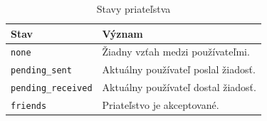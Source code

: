   \begin{table}[h]
      \centering                                                                                                                                                                                                                   
      \caption{Stavy priateľstva}
      \label{tab:friendship-states}
      \begin{tabular}{ll}
          \toprule                                                                                                                                                                                                                 
          \textbf{Stav} & \textbf{Význam} \\                                                                                                                                                                                       
          \midrule                                                                                                                                                                                                                 
          \texttt{none}              & Žiadny vzťah medzi používateľmi. \\                                                                                                                                                         
          \texttt{pending\_sent}     & Aktuálny používateľ poslal žiadosť. \\                                                                                                                                                      
          \texttt{pending\_received} & Aktuálny používateľ dostal žiadosť. \\                                                                                                                                                      
          \texttt{friends}           & Priateľstvo je akceptované. \\                                                                                                                                                              
          \bottomrule                                                                                                                                                                                                              
      \end{tabular}
  \end{table}

